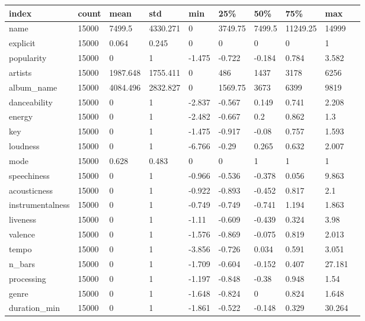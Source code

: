 \begin{center}
\begin{tiny}
\begin{tabular}{|l|l|l|l|l|l|l|l|l|l|}
\hline
\textbf{index} & \textbf{count} & \textbf{mean} & \textbf{std} & \textbf{min} & \textbf{25\%} & \textbf{50\%} & \textbf{75\%} & \textbf{max} \\
\hline
name & 15000 & 7499.5 & 4330.271 & 0 & 3749.75 & 7499.5 & 11249.25 & 14999 \\
explicit & 15000 & 0.064 & 0.245 & 0 & 0 & 0 & 0 & 1 \\
popularity & 15000 & 0 & 1 & -1.475 & -0.722 & -0.184 & 0.784 & 3.582 \\
artists & 15000 & 1987.648 & 1755.411 & 0 & 486 & 1437 & 3178 & 6256 \\
album\_name & 15000 & 4084.496 & 2832.827 & 0 & 1569.75 & 3673 & 6399 & 9819 \\
danceability & 15000 & 0 & 1 & -2.837 & -0.567 & 0.149 & 0.741 & 2.208 \\
energy & 15000 & 0 & 1 & -2.482 & -0.667 & 0.2 & 0.862 & 1.3 \\
key & 15000 & 0 & 1 & -1.475 & -0.917 & -0.08 & 0.757 & 1.593 \\
loudness & 15000 & 0 & 1 & -6.766 & -0.29 & 0.265 & 0.632 & 2.007 \\
mode & 15000 & 0.628 & 0.483 & 0 & 0 & 1 & 1 & 1 \\
speechiness & 15000 & 0 & 1 & -0.966 & -0.536 & -0.378 & 0.056 & 9.863 \\
acousticness & 15000 & 0 & 1 & -0.922 & -0.893 & -0.452 & 0.817 & 2.1 \\
instrumentalness & 15000 & 0 & 1 & -0.749 & -0.749 & -0.741 & 1.194 & 1.863 \\
liveness & 15000 & 0 & 1 & -1.11 & -0.609 & -0.439 & 0.324 & 3.98 \\
valence & 15000 & 0 & 1 & -1.576 & -0.869 & -0.075 & 0.819 & 2.013 \\
tempo & 15000 & 0 & 1 & -3.856 & -0.726 & 0.034 & 0.591 & 3.051 \\
n\_bars & 15000 & 0 & 1 & -1.709 & -0.604 & -0.152 & 0.407 & 27.181 \\
processing & 15000 & 0 & 1 & -1.197 & -0.848 & -0.38 & 0.948 & 1.54 \\
genre & 15000 & 0 & 1 & -1.648 & -0.824 & 0 & 0.824 & 1.648 \\
duration\_min & 15000 & 0 & 1 & -1.861 & -0.522 & -0.148 & 0.329 & 30.264 \\
\hline
\end{tabular}
\end{tiny}
\end{center}


